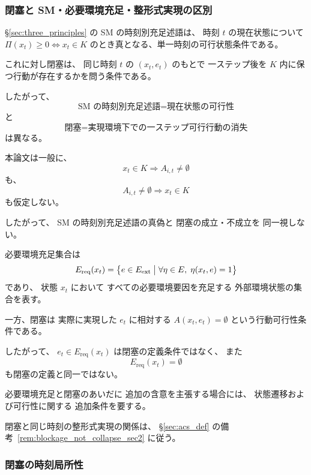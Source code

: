 \subsubsection{閉塞と SM・必要環境充足・整形式実現の区別}

\begin{remark}
\label{rem:blockage_vs_sm}
\S\ref{sec:three_principles} の SM の時刻別充足述語は、
時刻 $t$ の現在状態について
$\Pi(x_t)\ge0 \iff x_t\in K$
のとき真となる、単一時刻の可行状態条件である。

これに対し閉塞は、
同じ時刻 $t$ の $(x_t,e_t)$ のもとで
一ステップ後を $K$ 内に保つ行動が存在するかを問う条件である。

したがって、
\[
  \text{SM の時刻別充足述語}
  =
  \text{現在状態の可行性}
\]
と
\[
  \text{閉塞}
  =
  \text{実現環境下での一ステップ可行行動の消失}
\]
は異なる。

本論文は一般に、
\[
  x_t\in K
  \Longrightarrow
  A_{i,t}\neq\emptyset
\]
も、
\[
  A_{i,t}\neq\emptyset
  \Longrightarrow
  x_t\in K
\]
も仮定しない。

したがって、
SM の時刻別充足述語の真偽と
閉塞の成立・不成立を
同一視しない。
\end{remark}

\begin{remark}[閉塞と必要環境充足は異なる]
\label{rem:blockage_vs_required_environment}
必要環境充足集合は
\[
  E_{\mathrm{req}}(x_t)
  =
  \bigl\{
    e\in E_{\mathrm{ext}}
    \bigm|
    \forall\eta\in E,\;
    \eta(x_t,e)=1
  \bigr\}
\]
であり、
状態 $x_t$ において
すべての必要環境要因を充足する
外部環境状態の集合を表す。

一方、閉塞は
実際に実現した $e_t$ に相対する
$A(x_t,e_t)=\emptyset$
という行動可行性条件である。

したがって、
$e_t\in E_{\mathrm{req}}(x_t)$
は閉塞の定義条件ではなく、
また
\[
  E_{\mathrm{req}}(x_t)=\emptyset
\]
も閉塞の定義と同一ではない。

必要環境充足と閉塞のあいだに
追加の含意を主張する場合には、
状態遷移および可行性に関する
追加条件を要する。
\end{remark}

閉塞と同じ時刻の整形式実現の関係は、
\S\ref{sec:acs_def} の備考~\ref{rem:blockage_not_collapse_sec2} に従う。

\subsubsection{閉塞の時刻局所性}

